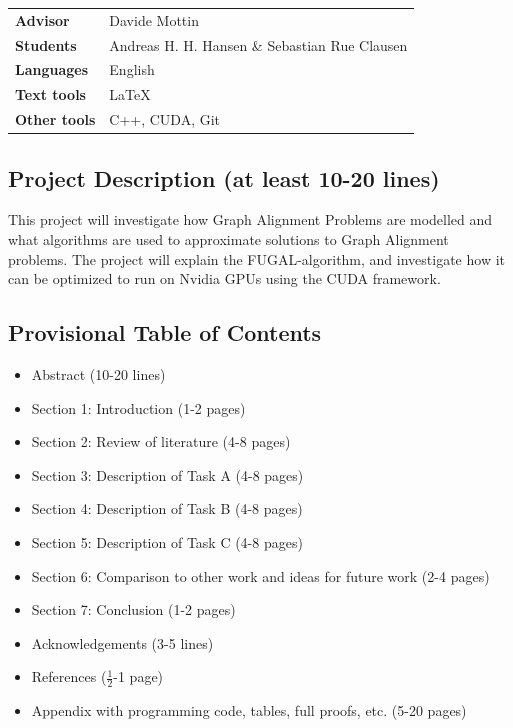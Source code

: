 \documentclass{article}
\begin{document}
\pagestyle{fancy}

\bgroup{}
\begin{table}[h]
\begin{tabular}{ll}
\textbf{Advisor}     & Davide Mottin \\
\textbf{Students}    & Andreas H. H. Hansen \& Sebastian Rue Clausen \\
\textbf{Languages}   & English \\
\textbf{Text tools}  & \LaTeX         \\
\textbf{Other tools} & C++, CUDA, Git
\end{tabular}
\end{table}
\egroup\vspace{-0.cm}

\subsection*{Project Description (at least 10-20 lines)}

This project will investigate how Graph Alignment Problems are modelled and what algorithms are used to approximate solutions to Graph Alignment problems. The project will explain the FUGAL-algorithm, and investigate how it can be optimized to run on Nvidia GPUs using the CUDA framework.

\subsection*{Provisional Table of Contents}
\begin{itemize}
    \item Abstract (10-20 lines)
    \item Section 1: Introduction (1-2 pages)
    \item Section 2: Review of literature (4-8 pages)
    \item Section 3: Description of Task A (4-8 pages)
    \item Section 4: Description of Task B (4-8 pages)
    \item Section 5: Description of Task C (4-8 pages)
    \item Section 6: Comparison to other work and ideas for future work (2-4 pages)
    \item Section 7: Conclusion (1-2 pages)
    \item Acknowledgements (3-5 lines)
    \item References ($\frac{1}{2}$-1 page)
    \item Appendix with programming code, tables, full proofs, etc. (5-20 pages)
\end{itemize}
\end{document}
